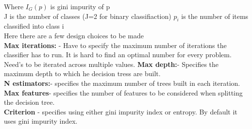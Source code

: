 \documentclass[sigconf]{acmart}
\begin{document}
Where $I_G(p)$ is gini impurity of p\\
J is the number of classes (J=2 for binary classifiaction)
$p_i$ is the number of items classified into class i\\
Here there are a few design choices to be made\\
\textbf{Max iterations:} - Have to specify the maximum number of iterations the classifier has to run. It is hard to find an optimal number for every problem. Need's to be iterated across multiple values. 
\textbf{Max depth:}- Specifies the maximum depth to which he decision tress are built.\\
\textbf{N estimators:}- specifies the maximum number of trees built in each iteration.\\
\textbf{Max features}- specifies the number of features to be considered when splitting the decision tree.\\
\textbf{Criterion} - specifies using either gini impurity index or entropy. By default it uses gini impurity index.\cite{Breiman2010}
\end{document}

